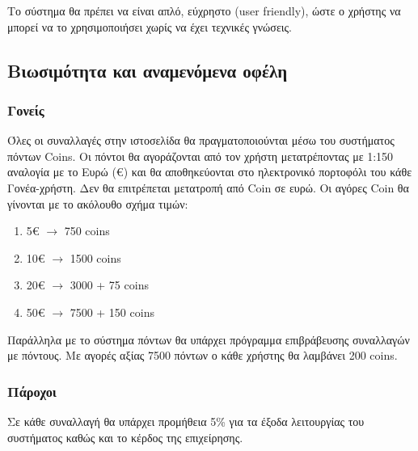 \documentclass[letterpaper,6pt]{article}
\begin{document}
Το σύστημα θα πρέπει να είναι απλό, εύχρηστο (user friendly), ώστε ο χρήστης να μπορεί να το χρησιμοποιήσει χωρίς να έχει τεχνικές γνώσεις.


\subsection{Βιωσιμότητα και αναμενόμενα οφέλη}

\subsubsection{Γονείς}


Όλες οι συναλλαγές στην ιστοσελίδα θα πραγματοποιούνται μέσω του συστήματος πόντων Coins. Οι πόντοι θα αγοράζονται από τον χρήστη μετατρέποντας με 1:150 αναλογία με το Ευρώ (€) και θα αποθηκεύονται στο ηλεκτρονικό πορτοφόλι του κάθε Γονέα-χρήστη. Δεν θα επιτρέπεται μετατροπή από Coin σε ευρώ. Οι αγόρες Coin θα γίνονται με το ακόλουθο σχήμα τιμών:

\begin{enumerate}
  \item 5€ $\to{}$ 750 coins
  \item 10€ $\to{}$ 1500 coins
  \item 20€ $\to{}$ 3000 + 75 coins
  \item 50€ $\to{}$ 7500 + 150 coins
\end{enumerate}

Παράλληλα με το σύστημα πόντων θα υπάρχει πρόγραμμα επιβράβευσης συναλλαγών με πόντους. Με αγορές αξίας 7500 πόντων ο κάθε χρήστης θα λαμβάνει 200 coins.


\subsubsection{Πάροχοι}

Σε κάθε συναλλαγή θα υπάρχει προμήθεια 5\% %
για τα έξοδα λειτουργίας του συστήματος καθώς και το κέρδος της επιχείρησης.
\end{document}
